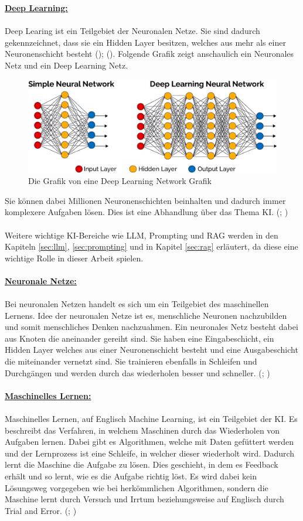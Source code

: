 \documentclass[12pt,toc=bib,toc=listof]{scrreprt}
\begin{document}
\noindent\textbf{\underline{Deep Learning:}}\\
\\
Deep Learing ist ein Teilgebiet der Neuronalen Netze. Sie sind dadurch gekennzeichnet, dass sie ein Hidden Layer besitzen, welches aus mehr als einer Neuronenschicht besteht (\cite{Bhatt2021}); (\cite{Zhu2021}). Folgende Grafik zeigt anschaulich ein Neuronales Netz und ein Deep Learning Netz.
\begin{figure} [H]
    \centering
    \includegraphics[width=0.75\linewidth]{./Bilder/Dymatrix_Deep_Learning_Networks.jpeg}
    \caption{Die Grafik von \textcite{Dymatrix2018} eine Deep Learning Network Grafik}
    \label{fig:enter-label}
\end{figure}
\noindent Sie können dabei Millionen Neuronenschichten beinhalten und dadurch immer komplexere Aufgaben lösen. Dies ist eine Abhandlung über das Thema KI. (\cite{Bhatt2021}; \cite{Zhu2021})\\
\\
Weitere wichtige KI-Bereiche wie LLM, Prompting und RAG werden in den Kapiteln \ref{sec:llm}, \ref{sec:prompting} und in Kapitel \ref{sec:rag} erläutert, da diese eine wichtige Rolle in dieser Arbeit spielen.\\
\\
\textbf{\underline{Neuronale Netze:}}\\
\\
Bei neuronalen Netzen handelt es sich um ein Teilgebiet des maschinellen Lernens. Idee der neuronalen Netze ist es, menschliche Neuronen nachzubilden und somit menschliches Denken nachzuahmen. Ein neuronales Netz besteht dabei aus Knoten die aneinander gereiht sind. Sie haben eine Eingabeschicht, ein Hidden Layer welches aus einer Neuronenschicht besteht und eine Ausgabeschicht die miteinander vernetzt sind. Sie trainieren ebenfalls in Schleifen und Durchgängen und werden durch das wiederholen besser und schneller. (\cite{Bhatt2021}; \cite{Zhu2021})\\
\\
\textbf{\underline{Maschinelles Lernen:}}\\
\\
Maschinelles Lernen, auf Englisch Machine Learning, ist ein Teilgebiet der KI. Es beschreibt das Verfahren, in welchem Maschinen durch das Wiederholen von Aufgaben lernen. Dabei gibt es Algorithmen, welche mit Daten gefüttert werden und der Lernprozess ist eine Schleife, in welcher dieser wiederholt wird. Dadurch lernt die Maschine die Aufgabe zu lösen. Dies geschieht, in dem es Feedback erhält und so lernt, wie es die Aufgabe richtig löst. Es wird dabei kein Lösungsweg vorgegeben wie bei herkömmlichen Algorithmen, sondern die Maschine lernt durch Versuch und Irrtum beziehungsweise auf Englisch durch Trial and Error. (\cite{Bhatt2021}; \cite{Zhu2021})
\end{document}
